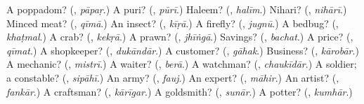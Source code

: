 \begin{tcolorbox}[breakable,colback=teal!4,colframe=teal!35!black,title={Before you move on}]
A poppadom? (\textbf{}, \emph{pāpaṛ}.) A puri? (\textbf{}, \emph{pūrī}.) Haleem? (\textbf{}, \emph{halīm}.) Nihari? (\textbf{}, \emph{nihārī}.) Minced meat? (\textbf{}, \emph{qīmā}.) An insect? (\textbf{}, \emph{kīṛā}.) A firefly? (\textbf{}, \emph{jugnū}.) A bedbug? (\textbf{}, \emph{khaṭmal}.) A crab? (\textbf{}, \emph{kekṛā}.) A prawn? (\textbf{}, \emph{jhīṅgā}.) Savings? (\textbf{}, \emph{bachat}.) A price? (\textbf{}, \emph{qīmat}.) A shopkeeper? (\textbf{}, \emph{dukāndār}.) A customer? (\textbf{}, \emph{gāhak}.) Business? (\textbf{}, \emph{kārobār}.) A mechanic? (\textbf{}, \emph{mistrī}.) A waiter? (\textbf{}, \emph{berā}.) A watchman? (\textbf{}, \emph{chaukīdār}.) A soldier; a constable? (\textbf{}, \emph{sipāhī}.) An army? (\textbf{}, \emph{fauj}.) An expert? (\textbf{}, \emph{māhir}.) An artist? (\textbf{}, \emph{fankār}.) A craftsman? (\textbf{}, \emph{kārīgar}.) A goldsmith? (\textbf{}, \emph{sunār}.) A potter? (\textbf{}, \emph{kumhār}.)
\end{tcolorbox}
